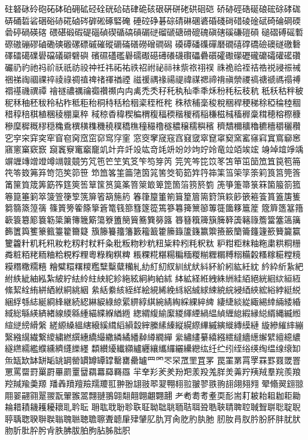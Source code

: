 砫砮砯砱砲砳砵砶砽砿硁硂硄硆硈硉硊硋硍硏硑硓硔硘硙
硚硛硜硞硟硠硡硢硣硥硦硧硩硰硱硲硳硴硵硶硸硹硺硻硽
硾硿碀碁碂碃碄碅碆碈碊碋碏碐碒碔碕碖碙碝碞碠碢碤碦
碨碪碫碬碮碯碵碶碷碻碽碿磀磂磃磄磆磇磈磌磍磎磏磑磒
磓磖磗磘磛磜磝磞磟磠磡磢磤磥磦磩磪磫磭磮磰磱磳磵磶
磸磹磻磼磾磿礀礂礃礄礆礇礈礉礊礋礌礍礏礐礑礒礔礕礖
礗礘礚礛礜礝礟礠礡礢礣礥礧礨礩礭礮礯礰礲礳礵礶礷礸
礹礽礿祂祃祄祅祇祊祋祌祍祎祏祐祑祒祔祕祘祙祡祣祤祦
祩祪祫祬祮祰祱祲祳祴祵祶祹祻祼祽祾祿禂禃禆禇禈禉禋
禌禐禑禒禓禔禕禖禗禘禙禛禜禝禞禟禠禡禢禣禤禥禨禩禫
禬禭禯禲禴禵禶禷⽱禸禼禿秂秄秅秇秈秊秊秌秎秏秐秓秔
秖秗秙秚秛秜秝秞秠秡秢秥秨秪秬秮秱秲秳秴秵秶秷秹秺
秼秾秿稁稄稅稇稈稉稊稌稏稐稑稒稓稕稖稘稙稛稜稝稟稡
稢稤稥稦稧稨稩稪稫稬稭稯稰稲稴稵稶稸稺稾穁穂穃穄穅
穇穈穉穊穋穏穐穒穓穔穕穖穘穙穚穛穜穝穞穟穠穣穤穥穦
穧穨穪穬穭穮穯穱穲穳穵穻穼穽穾窂窅窇窉窊窋窌窎窏窐
窓窔窙窚窛窞窡窢窣窤窧窫窯窰窱窲窴窵窷窸窹窻窼窽窾
竀竁竂竃竆竉竌竍竎竏竐竑竒竓竔竕竗竘竚竛竜竝竡竢竤
竧竨竩竫竬竮竰竱竲竳竴竵竷竸竻竼竾笀笁笂笅笇笉笌笍
笎笐笒笓笖笗笘笚笜笝笟笡笢笣笧笩笭笯笰笲笴笵笶笷笹
笻笽笿筀筁筂筃筄筈筊筍筎筓筕筗筙筜筞筟筡筣筤筥筦筨
筩筪筫筬筭筯筰筳筴筶筸筺筼筽筿箁箂箃箄箆箇箈箉箊箌
箎箏箑箒箓箖箘箙箚箛箞箟箠箣箤箥箮箯箰箲箳箵箶箷箹
箺箻箼箽箾箿篂篃篅篈篊篍篎篏篐篒篔篕篖篗篘篛篜篞篟
篠篢篣篧篨篫篬篭篯篰篲篴篵篶篸篹篺篻篽篿簁簂簃簄簅
簆簈簉簊簎簐簑簒簓簔簕簗簘簙簚簛簜簝簠簢簤簥簨簩簬
簭簮簯簰簱簲簳簴簵簶簷簹簺簻簼籂籄籅籆籇籈籉籊籋籎
籏籐籑籒籓籔籕籖籗籘籙籚籛籝籞籡籢籣籥籦籧籨籫籭籯
籰籱籵籶籷籸籹籺籾籿粀粁粂粃粄粅粆粇粈粊粋粌粍粎粏
粐粓粔粖粙粚粛粠粡粣粦粧粨粩粫粬粭粯粰粴粵粶粷粸粺
粻粿糀糂糃糄糆糉糋糎糏糐糑糒糓糔糘糚糛糡糢糣糤糥糦
糩糪糫糬糭糮糱糳糵糷糺糼糽糿紁紃紌紎紏紑紒紖紘紝紞
紟紣紤紥紦紨紩紪紬紭紮紴紵紶紷紸紻紽紾絁絃絅絇絈絉
絊絋経絍絏絑絒絓絔絕絖絗絘絙絚絛絜絟絠絣絤絥絧絩絪
絫絬絭絯絰絴絵絸絺絻絼絽絾絿綀綂綄綅綇綊綋綌綍綎綐
綑綒綔綕綖綗綘継続綛綝綟綠綡綤綥綧綨綩綪綯綵綶綷綼
緀緁緂緃緅緆緈緉緌緍緎総緐緓緕緖線緛緜緟緢緤緥緧緪
緫緭緮緰緳緵緷緸緺緼緽緾緿縀縁縂縃縄縅縆縇縌縍縎縏
縒縓縔縕縖縗縘縙縚縜縠縡縢縤縥縦縨縩縪縬縯縰縳縸縺
縼縿繀繂繃繄繈繉繊繋繌繍繎繏繐繑繓繖繗繘繙繛繜繝繟
繠繡繣繤繥繦繧繨繬繱繲繴繵繶繷繸繺繻繿纀纁纃纄纅纆
纇纉纋纎纐纑纒纕纗纙纚纝纞纮纴纻纼绖绤绬绹缊缐缞缷
缹缻缼缽缾缿罀罁罃罆罇罈罉罊罋罍罏罒罓罖罙罛罜罝罞
罠罣罤罥罦罧罫罬罭罯罳罵罶罸罺罻罼罽罿羀羂羃羄羇羉
羋羍羏羐羑羒羓羕羖羗羘羙羛羜羠羢羣羦羨羪羫羬羭羮羱
羳羴羵羶羷羺羻羾翀翂翃翄翆翇翈翉翋翍翏翐翑翓翖翗翙
翚翛翜翝翞翢翣翤翧翨翪翫翬翭翯翲翴翵翶翷翸翺翽翾翿
耂耇耈耉耊耎耏耑耓耚耛耝耞耟耡耣耤耫耭耯耰耲耴耹耺
耼耾聀聁聄聅聇聈聉聎聏聐聑聓聕聗聙聛聜聝聟聠聡聢聣
聤聥聦聧聨聫聬聭聮聴聸聺聻聼肁肂肈肊肍肎肏肐肑肒肔
肕肗肙肞肣肦肧肨肬肰肳肵肶肸肹肻胅胇胈胉胊胋胏胐胑
